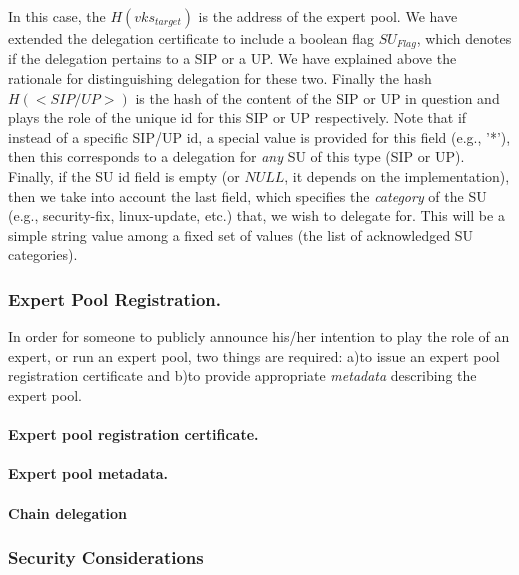 In this case, the $H(vks_{target})$ is the address of the expert pool. We have extended the delegation certificate to include a boolean flag $SU_{Flag}$, which denotes if the delegation pertains to a SIP or a UP. We have explained above the rationale for distinguishing delegation for these two. Finally the hash $H(<SIP/UP>)$ is the hash of the content of the SIP or UP in question and plays the role of the unique id for this SIP or UP respectively. Note that if instead of a specific SIP/UP id, a special value is provided for this field (e.g., '*'), then this corresponds to a delegation for \emph{any} SU of this type (SIP or UP). Finally, if the SU id field is empty (or $NULL$, it depends on the implementation), then we take into account the last field, which specifies the \emph{category} of the SU (e.g., security-fix, linux-update, etc.) that, we wish to delegate for. This will be a simple string value among a fixed set of values (the list of acknowledged SU categories).

\subsubsection*{Expert Pool Registration.}
In order for someone to publicly announce his/her intention to play the role of an expert, or run an expert pool, two things are required: a)to issue an expert pool registration certificate and b)to provide appropriate \emph{metadata} describing the expert pool.

\paragraph{Expert pool registration certificate.}

\paragraph{Expert pool metadata.}

\paragraph{Chain delegation}


\subsubsection*{Security Considerations}

